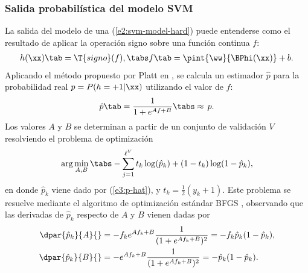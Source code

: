 %
\subsubsection{Salida probabilística del modelo SVM}
%
La salida del modelo de una \MVS{} (\ref{e2:svm-model-hard}) puede
entenderse como el resultado de aplicar la operación signo sobre una
función continua $f$:
%
\begin{align}
\label{e3:svm-model-as-sign-f}
  h(\xx) \tab= \T{signo}(f),\tabs
  f\tab=\pint{\ww}{\BPhi(\xx)}+b.
\end{align}
%
Aplicando el método propuesto por {Platt} en \cite{platt}, se calcula
un estimador $\hat{p}$ para la probabilidad real $p=P(h=+1|\xx)$
utilizando el valor de $f$:
%
\begin{align}
\label{e3:p-hat}
  \hat{p}\tab=\frac{1}{1+e^{Af+B}} \tabs\approx\,{}p.%
\end{align}
%
Los valores $A$ y $B$ se determinan a partir de un conjunto de validación
$V$ resolviendo el problema de optimización
%
\begin{align}
  \arg\min_{A,B} \tabs -\sum_{j=1}^{\ell^V} t_k\log(\hat{p}_k)+(1-t_k)\log(1-\hat{p}_k),
  \label{abproblem}
\end{align}
%
en donde $\hat{p}_k$ viene dado por (\ref{e3:p-hat}), y
$t_k=\frac{1}{2}({y_k+1})$.
Este problema se resuelve mediante el algoritmo de optimización
estándar BFGS \cite{nocedal}, observando que las derivadas de
$\hat{p}_k$ respecto de $A$ y $B$ vienen dadas por
%
\begin{align}
  \begin{split}
    \dpar{\hat{p}_k}{A}{}&=-f_k e^{Af_k+B}\frac{1}{(1+e^{Af_k+B})^2}
    =-f_k\hat{p}_k(1-\hat{p}_k),\\
    \dpar{\hat{p}_k}{B}{}&=    -e^{Af_k+B}\frac{1}{(1+e^{Af_k+B})^2}
    =-   \hat{p}_k(1-\hat{p}_k).
  \end{split}
\label{e3:deriv-pk-wrt-AB}
\end{align}
%


